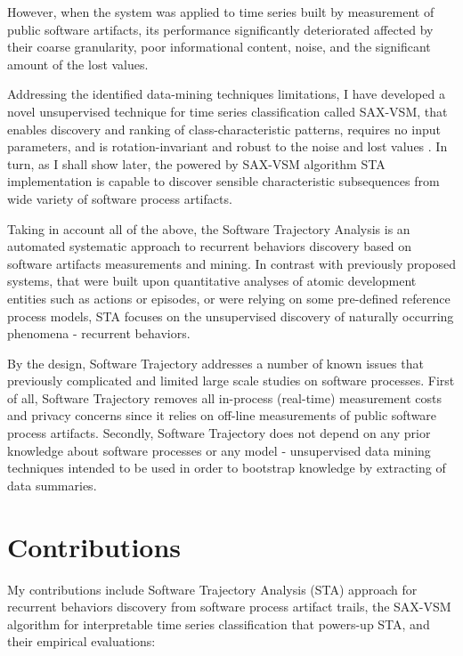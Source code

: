 However, when the system was applied to time series built by measurement of public software artifacts, 
its performance significantly deteriorated affected by their coarse granularity, poor informational content,
noise, and the significant amount of the lost values. 

Addressing the identified data-mining techniques limitations, 
I have developed a novel unsupervised technique for time series classification called SAX-VSM, that enables 
discovery and ranking of class-characteristic patterns, requires no input parameters, and is rotation-invariant 
and robust to the noise and lost values \cite{sax-vsm}. 
In turn, as I shall show later, the powered by SAX-VSM algorithm STA implementation is capable to discover 
sensible characteristic subsequences from wide variety of software process artifacts.

Taking in account all of the above, the Software Trajectory Analysis is an automated systematic approach to 
recurrent behaviors discovery based on software artifacts measurements and mining. 
In contrast with previously proposed systems, that were built upon quantitative analyses of atomic development 
entities such as actions or episodes, or were relying on some pre-defined reference process models, 
STA focuses on the unsupervised discovery of naturally occurring phenomena - recurrent behaviors. 

By the design, Software Trajectory addresses a number of known issues that previously complicated and limited 
large scale studies on software processes.
First of all, Software Trajectory removes all in-process (real-time) measurement costs and privacy concerns since 
it relies on off-line measurements of public software process artifacts. 
Secondly, Software Trajectory does not depend on any prior knowledge about software processes or any model - 
unsupervised data mining techniques intended to be used in order to bootstrap knowledge by extracting of data 
summaries. 


\section{Contributions}\label{section_contributions}
My contributions include Software Trajectory Analysis (STA) approach for recurrent behaviors discovery
from software process artifact trails, the SAX-VSM algorithm for interpretable time series classification 
that powers-up STA, and their empirical evaluations: 

